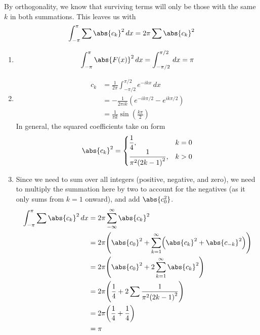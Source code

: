 \documentclass[a4paper]{article}
\begin{document}
By orthogonality, we know that surviving terms will only be those with the same \( k \) in both summations. This leaves us with
\[
	\int^{\pi}_{-\pi} \sum \abs{c_{k}}^{2} \, dx = 2 \pi \sum \abs{c_{k}}^{2} 
\]


\begin{enumerate}[label=(\alph*)]
	\item 
	\[
		\int^{\pi}_{-\pi} \abs{F \!\left( x \right)}^{2} \, dx = \int^{\pi / 2}_{-\pi / 2} \, dx = \pi   
	\]
	\item 
	\begin{align*}
		c_{k} & = \frac{1}{2 \pi} \int^{\pi / 2}_{-\pi / 2} e^{-ikx} \, dx \\ 
		      & = -\frac{1}{2 \pi ik} \!\left( e^{-ik \pi / 2} - e^{i k \pi / 2} \right) \\ 
		      & = \frac{1}{\pi k} \sin\!\left(\frac{k \pi}{2}\right)
	\end{align*}
	In general, the squared coefficients take on form
	\[
		\abs{c_{k}}^{2} = 
		\begin{cases}
			\displaystyle{\frac{1}{4}}, & k = 0 \\
			\displaystyle{\frac{1}{\pi^{2} \!\left( 2k - 1 \right)^{2}}}, & k > 0
		\end{cases}
	\]
	\item 
	Since we need to sum over all integers (positive, negative, and zero), we need to multiply the summation here by two to account for the negatives (as it only sums from \( k = 1 \) onward), and add \( \abs{c_{0}^{2}} \).
	\begin{align*}
		\int^{\pi}_{-\pi} \sum \abs{c_{k}}^{2} \, dx & = 2 \pi \sum_{-\infty}^{\infty}  \abs{c_{k}}^{2} \\
										& = 2 \pi \!\left( \abs{c_{0}}^{2} + \sum_{k = 1}^{\infty} \!\left( \abs{c_{k}}^{2} + \abs{c_{-k}}^{2} \right) \right) \\
										& = 2 \pi \!\left( \abs{c_{0}}^{2} + 2 \sum_{k = 1}^{\infty} \abs{c_{k}}^{2} \right) \\
		 & = 2 \pi \!\left( \frac{1}{4} + 2 \sum \frac{1}{\pi^{2} \!\left( 2k - 1 \right)^{2}} \right) \\ 
		 & = 2 \pi \!\left( \frac{1}{4} + \frac{1}{4} \right) \\
		 & = \pi
	\end{align*}
\end{enumerate}
\end{document}
